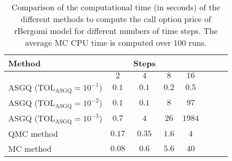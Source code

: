 \FloatBarrier
\begin{table}[h!]
	\centering
	\begin{tabular}{l*{6}{c}r}
		\toprule[1.5pt]
		Method & & Steps  & &     \\
		\hline	
		& $2$ & $4$ & $8$ & $16$ &   \\
		\hline
		ASGQ ($\text{TOL}_{\text{ASGQ}}=10^{-1}$)  & $0.1$ & $0.1$ & $0.2$ & $0.5$ \\
		ASGQ ($\text{TOL}_{\text{ASGQ}}=10^{-2}$)  & $0.1$ & $0.1$ & $8$ & $97$ \\
		ASGQ ($\text{TOL}_{\text{ASGQ}}=10^{-3}$)  & $0.7$ & $4$ & $26$ & $1984$ \\
		\hline
		QMC method    & $ 0.17 $  & $  0.35$  & $ 1.6$ & $ 4$  \\	
		MC method   & $ 0.08 $  & $  0.6$  & $ 5.6$ & $ 40$  \\	
		\bottomrule[1.25pt]
	\end{tabular}
	\caption{Comparison of the computational time (in seconds) of the different methods to compute the call option price of rBergomi model for different numbers of time steps. The average  MC CPU time is computed over $100$ runs. }
	\label{Comparsion of the computational time of  MC and MISC, used to compute Call option price of rBergomi model for different number of time steps. Case set5}
\end{table}

\FloatBarrier


